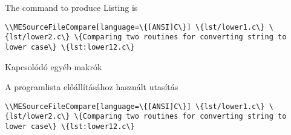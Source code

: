 {
\par\noindent The command to produce Listing \ao{\ref{lst:lower12.c}} is
\par\noindent\lstinline|\\MESourceFileCompare[language=\{[ANSI]C\}] \{lst/lower1.c\} \{lst/lower2.c\} \{Comparing two routines for converting string to lower case\} \{lst:lower12.c\}|


}
{Kapcsolódó egyéb makrók}
{
\par\noindent A \ao{\ref{lst:lower12.c}} programlista előállításához használt
utasítás
\par\noindent\lstinline|\\MESourceFileCompare[language=\{[ANSI]C\}] \{lst/lower1.c\} \{lst/lower2.c\} \{Comparing two routines for converting string to lower case\} \{lst:lower12.c\}|

}


